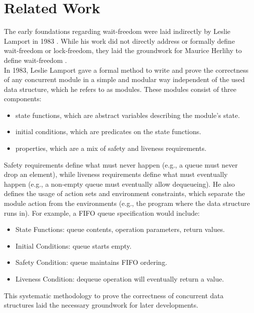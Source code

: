 \chapter{Related Work}\label{ch:related-work}

The early foundations regarding wait-freedom were laid indirectly by Leslie Lamport in 1983 \cite{Lamport1983SPSCCircularBuffer}. While his work did not directly address or formally define wait-freedom or lock-freedom, they laid the groundwork for Maurice Herlihy to define wait-freedom \cite{herlihy1991wait}. \\
In 1983, Leslie Lamport gave a formal method to write and prove the correctness of any concurrent module in a simple and modular way independent of the used data structure, which he refers to as modules. These modules consist of three components: 
\begin{itemize}
   \item state functions, which are abstract variables describing the module's state.
   \item initial conditions, which are predicates on the state functions.
   \item properties, which are a mix of safety and liveness requirements.
\end{itemize}
Safety requirements define what must never happen (e.g., a queue must never drop an element), while liveness requirements define what must eventually happen (e.g., a non-empty queue must eventually allow dequeueing). He also defines the usage of action sets and environment constraints, which separate the module action from the environments (e.g., the program where the data structure runs in). For example, a \ac{FIFO} queue specification would include:
\begin{itemize}
   \item State Functions: queue contents, operation parameters, return values.
   \item Initial Conditions: queue starts empty.
   \item Safety Condition: queue maintains \ac{FIFO} ordering.
   \item Liveness Condition: dequeue operation will eventually return a value.
\end{itemize}
This systematic methodology to prove the correctness of concurrent data structures laid the necessary groundwork for later developments. \cite{Lamport1983SPSCCircularBuffer}


